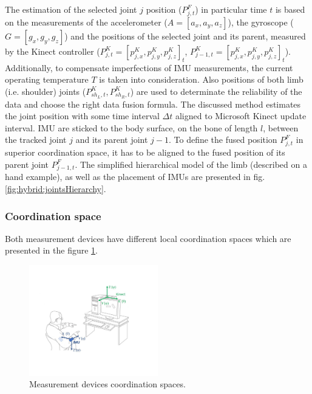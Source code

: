 \documentclass[sensors,article,submit,moreauthors,pdftex,10pt,a4paper]{mdpi}
\begin{document}
The estimation of the selected joint $j$ position ($P^F_{j,t}$) in particular time $t$ is based on the measurements of the accelerometer ($A=[a_x,a_y,a_z]$), the gyroscope ($G=[g_x,g_y,g_z]$) and the positions of the selected joint and its parent, measured by the Kinect controller ($P^K_{j,t} = [p^K_{j,x}, p^K_{j,y}, p^K_{j,z}]_t$, $P^K_{j-1,t} = [p^K_{j,x}, p^K_{j,y}, p^K_{j,z}]_t$). Additionally, to compensate imperfections of IMU measurements, the current operating temperature $T$ is taken into consideration. Also positions of both limb (i.e. shoulder) joints ($ P^K_{sh_L,t},P^K_{sh_R,t}$) are used to determinate the reliability of the data and choose the right data fusion formula. The discussed method estimates the joint position with some time interval $\Delta t$ aligned to Microsoft Kinect update interval. IMU are sticked to the body surface, on the bone of length $l$, between the tracked joint $j$ and its parent joint $j-1$. To define the fused position $P^F_{j,t}$ in superior coordination space, it has to be aligned to the fused position of its parent joint $P^F_{j-1,t}$. The simplified hierarchical model of the limb (described on a hand example), as well as the placement of IMUs are presented in fig. \ref{fig:hybrid:jointsHierarchy}.	
		

\subsubsection{Coordination space}
Both measurement devices have different local coordination spaces which are presented in the figure \ref{fig:hybrid:coordinationSpaces}.
		

\begin{figure}[H] %
	\centering
	\includegraphics[width=0.5\textwidth]{Figure10.jpg}
	\caption{Measurement devices coordination spaces.}
	\label{fig:hybrid:coordinationSpaces}
\end{figure}
	
\end{document}
